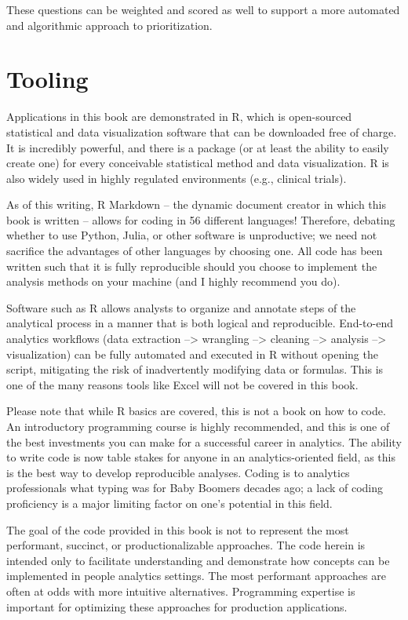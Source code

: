 \documentclass[
]{book}
\begin{document}
These questions can be weighted and scored as well to support a more automated and algorithmic approach to prioritization.

\hypertarget{tooling}{%
\section{Tooling}\label{tooling}}

Applications in this book are demonstrated in R, which is open-sourced statistical and data visualization software that can be downloaded free of charge. It is incredibly powerful, and there is a package (or at least the ability to easily create one) for every conceivable statistical method and data visualization. R is also widely used in highly regulated environments (e.g., clinical trials).

As of this writing, R Markdown -- the dynamic document creator in which this book is written -- allows for coding in 56 different languages! Therefore, debating whether to use Python, Julia, or other software is unproductive; we need not sacrifice the advantages of other languages by choosing one. All code has been written such that it is fully reproducible should you choose to implement the analysis methods on your machine (and I highly recommend you do).

Software such as R allows analysts to organize and annotate steps of the analytical process in a manner that is both logical and reproducible. End-to-end analytics workflows (data extraction --\textgreater{} wrangling --\textgreater{} cleaning --\textgreater{} analysis --\textgreater{} visualization) can be fully automated and executed in R without opening the script, mitigating the risk of inadvertently modifying data or formulas. This is one of the many reasons tools like Excel will not be covered in this book.

Please note that while R basics are covered, this is not a book on how to code. An introductory programming course is highly recommended, and this is one of the best investments you can make for a successful career in analytics. The ability to write code is now table stakes for anyone in an analytics-oriented field, as this is the best way to develop reproducible analyses. Coding is to analytics professionals what typing was for Baby Boomers decades ago; a lack of coding proficiency is a major limiting factor on one's potential in this field.

The goal of the code provided in this book is not to represent the most performant, succinct, or productionalizable approaches. The code herein is intended only to facilitate understanding and demonstrate how concepts can be implemented in people analytics settings. The most performant approaches are often at odds with more intuitive alternatives. Programming expertise is important for optimizing these approaches for production applications.
\end{document}

